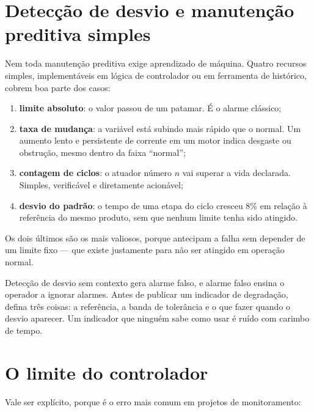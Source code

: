 
\section{Detecção de desvio e manutenção preditiva simples}

Nem toda manutenção preditiva exige aprendizado de máquina. Quatro recursos simples, implementáveis
em lógica de controlador ou em ferramenta de histórico, cobrem boa parte dos casos:

\begin{enumerate}
  \item \textbf{limite absoluto}: o valor passou de um patamar. É o alarme clássico;
  \item \textbf{taxa de mudança}: a variável está subindo mais rápido que o normal. Um aumento lento
        e persistente de corrente em um motor indica desgaste ou obstrução, mesmo dentro da faixa
        ``normal'';
  \item \textbf{contagem de ciclos}: o atuador número $n$ vai superar a vida declarada. Simples,
        verificável e diretamente acionável;
  \item \textbf{desvio do padrão}: o tempo de uma etapa do ciclo cresceu 8\% em relação à referência
        do mesmo produto, sem que nenhum limite tenha sido atingido.
\end{enumerate}

Os dois últimos são os mais valiosos, porque antecipam a falha sem depender de um limite fixo --- que
existe justamente para não ser atingido em operação normal.

\begin{atencao}
Detecção de desvio sem contexto gera alarme falso, e alarme falso ensina o operador a ignorar
alarmes. Antes de publicar um indicador de degradação, defina três coisas: a referência, a banda de
tolerância e o que fazer quando o desvio aparecer. Um indicador que ninguém sabe como usar é ruído
com carimbo de tempo.
\end{atencao}

\section{O limite do controlador}

Vale ser explícito, porque é o erro mais comum em projetos de monitoramento:

